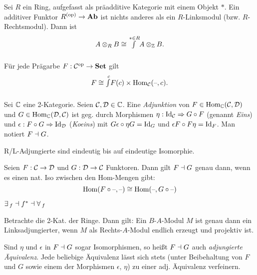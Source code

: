 \documentclass{cheat-sheet}
\begin{document}
\begin{bsp}
  Sei $R$ ein Ring, aufgefasst als präadditive Kategorie mit einem Objekt $*$.
  Ein additiver Funktor $R^{(\mathrm{op})} \to \mathbf{Ab}$ ist nichts anderes als ein $R$-Linksmodul (bzw. $R$-Rechtsmodul). Dann ist
  \[ A \otimes_R B \cong {\textstyle \int\limits_{}^{* \in R}} A \otimes_{\mathbb{Z}} B. \]
\end{bsp}

\begin{lem}
  Für jede Prägarbe $F : \mathcal{C}^{\mathrm{op}} \to \mathbf{Set}$ gilt
  \[ F \cong {\textstyle \int\limits_{}^{c}} F(c) \times \operatorname{Hom}_{\mathcal{C}}(\text{--}, c). \]
\end{lem}

\begin{defn}
  Sei $\mathbb{C}$ eine 2-Kategorie. Seien $\mathcal{C}, \mathcal{D} \in \mathbb{C}$. Eine \emph{Adjunktion} von $F \in \operatorname{Hom}_{\mathbb{C}}(\mathcal{C}, \mathcal{D})$ und $G \in \operatorname{Hom}_{\mathbb{C}}(\mathcal{D}, \mathcal{C})$ ist geg. durch Morphismen $\eta : \operatorname{Id}_{\mathcal{C}} \Rightarrow G \circ F$ (genannt \emph{Eins}) und $\epsilon : F \circ G \Rightarrow \operatorname{Id}_{\mathcal{D}}$ (\emph{Koeins}) mit $G \epsilon \circ \eta G = \operatorname{Id}_G$ und $\epsilon F \circ F \eta = \operatorname{Id}_F$.
  Man notiert $F \dashv G$.
\end{defn}

\begin{lem}
  R/L-Adjungierte sind eindeutig bis auf eindeutige Isomorphie.
\end{lem}

\begin{bem}
  Seien $F : \mathcal{C} \to \mathcal{D}$ und $G : \mathcal{D} \to \mathcal{C}$ Funktoren. Dann gilt $F \dashv G$ genau dann, wenn es einen nat. Iso zwischen den Hom-Mengen gibt:
  \[ \operatorname{Hom}(F \circ \text{--}, \text{--}) \cong \operatorname{Hom}(\text{--}, G \circ \text{--}) \]
\end{bem}

\begin{bsp}
  $\exists \,_f \dashv f^* \dashv \forall \,_f$
\end{bsp}

\begin{bsp}
  Betrachte die 2-Kat. der Ringe. Dann gilt: Ein $B$-$A$-Modul $M$ ist genau dann ein Linksadjungierter, wenn $M$ als Rechts-$A$-Modul endlich erzeugt und projektiv ist.
\end{bsp}

\begin{bem}
  Sind $\eta$ und $\epsilon$ in $F \dashv G$ sogar Isomorphismen, so heißt $F \dashv G$ auch \emph{adjungierte Äquivalenz}. Jede beliebige Äquivalenz lässt sich stets (unter Beibehaltung von $F$ und $G$ sowie einem der Morphismen $\epsilon$, $\eta$) zu einer adj. Äquivalenz verfeinern.
\end{bem}
\end{document}
